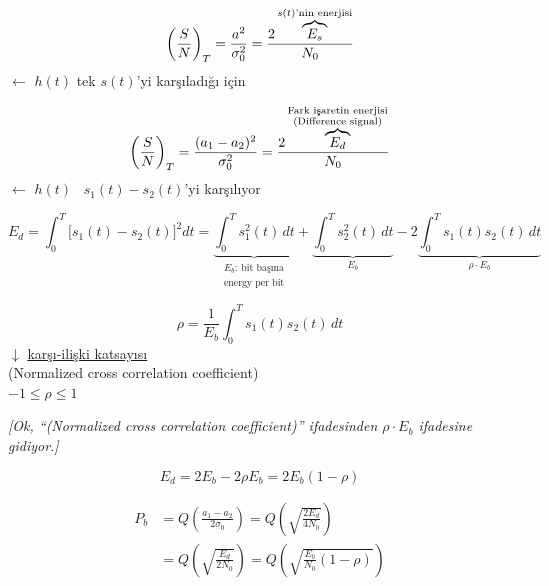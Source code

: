 \documentclass[11pt,a4paper]{article}
\begin{document}
\[ \left(\frac{S}{N}\right)_T=\frac{a^2}{\sigma_0^2}=\frac{2\overbrace{E_s}^{\text{\scriptsize $s(t)$'nin enerjisi}}}{N_0} \]
$\leftarrow$ $h(t)$ tek $s(t)$'yi karşıladığı için

\[ \left(\frac{S}{N}\right)_T=\frac{(a_1-a_2)^2}{\sigma_0^2}=\frac{2\overbrace{E_d}^{\substack{\text{\scriptsize Fark işaretin enerjisi}\\ \text{\scriptsize (Difference signal)}}}}{N_0} \]
$\leftarrow$ $h(t)$ \ $s_1(t)-s_2(t)$'yi karşılıyor

\[ E_d=\int_0^T\bigl[s_1(t)-s_2(t)\bigr]^2dt=\underbrace{\int_0^T s_1^2(t)\,dt}_{\substack{E_b:\ \text{bit başına}\\ \text{energy per bit}}}+\underbrace{\int_0^T s_2^2(t)\,dt}_{E_b}-2\underbrace{\int_0^T s_1(t)s_2(t)\,dt}_{\rho\cdot E_b} \]

\[ \rho=\frac{1}{E_b}\int_0^T s_1(t)s_2(t)\,dt \]
$\downarrow$ \underline{karşı-ilişki katsayısı} \\
(Normalized cross correlation coefficient) \\
$-1\le\rho\le 1$

\textit{[Ok, ``(Normalized cross correlation coefficient)'' ifadesinden $\rho\cdot E_b$ ifadesine gidiyor.]}

\[ E_d=2E_b-2\rho E_b=2E_b(1-\rho) \]

\[ \begin{aligned} P_b&=Q\left(\frac{a_1-a_2}{2\sigma_0}\right)=Q\left(\sqrt{\frac{2E_d}{4N_0}}\right) \\ &=Q\left(\sqrt{\frac{E_d}{2N_0}}\right)=Q\left(\sqrt{\frac{E_b}{N_0}(1-\rho)}\right) \end{aligned} \]
\end{document}
